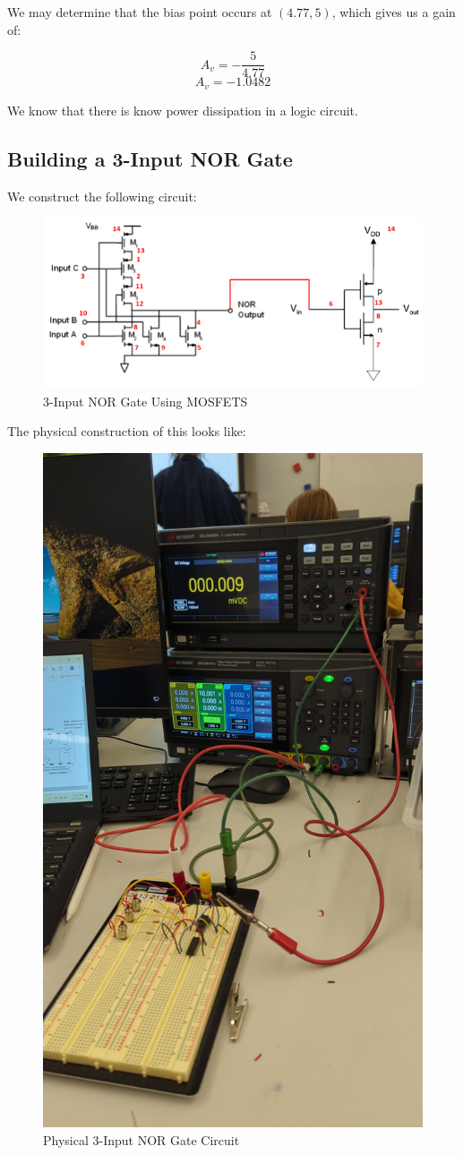 \documentclass[
	letterpaper, %
	10pt, %
]{CSUniSchoolLabReport}
\begin{document}
We may determine that the bias point occurs at $(4.77,5)$, which gives us a gain of:

$$A_v=-\frac{5}{4.77}$$
$$\boxed{A_v=-1.0482}$$

We know that there is know power dissipation in a logic circuit.

\subsection{Building a 3-Input NOR Gate}

We construct the following circuit:

\begin{figure}[H]
  \centering
  \includegraphics[width=.9\textwidth]{Figures/L5F6}
  \caption{3-Input NOR Gate Using MOSFETS}
  \label{fig:6}
\end{figure}

The physical construction of this looks like:

\begin{figure}[H]
  \centering
  \includegraphics[width=.7\textwidth,angle=270]{Figures/L5F7}
  \caption{Physical 3-Input NOR Gate Circuit}
  \label{fig:7}
\end{figure}
\end{document}
